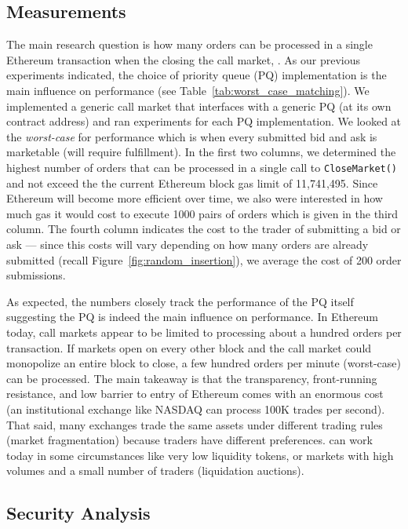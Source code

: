  \subsection{Measurements}
 
 
 
The main research question is how many orders can be processed in a single Ethereum transaction when the closing the call market, . As our previous experiments indicated, the choice of priority queue (PQ) implementation is the main influence on performance (see Table~\ref{tab:worst_case_matching}). We implemented a generic call market that interfaces with a generic PQ (at its own contract address) and ran experiments for each PQ implementation. We looked at the \textit{worst-case} for performance which is when every submitted bid and ask is marketable (\ie will require fulfillment). In the first two columns, we determined the highest number of orders that can be processed in a single call to \texttt{CloseMarket()} and not exceed the the current Ethereum block gas limit of 11,741,495. Since Ethereum will become more efficient over time, we also were interested in how much gas it would cost to execute 1000 pairs of orders which is given in the third column. The fourth column indicates the cost to the trader of submitting a bid or ask --- since this costs will vary depending on how many orders are already submitted (recall Figure~\ref{fig:random_insertion}), we average the cost of 200 order submissions. 

As expected, the numbers closely track the performance of the PQ itself suggesting the PQ is indeed the main influence on performance. In Ethereum today, call markets appear to be limited to processing about a hundred orders per transaction. If markets open on every other block and the call market could monopolize an entire block to close, a few hundred orders per minute (worst-case) can be processed. The main takeaway is that the transparency, front-running resistance, and low barrier to entry of Ethereum comes with an enormous cost (\ie an institutional exchange like NASDAQ can process 100K trades per second). That said, many exchanges trade the same assets under different trading rules (\ie market fragmentation) because traders have different preferences. \cm can work today in some circumstances like very low liquidity tokens, or markets with high volumes and a small number of traders (\eg liquidation auctions). 

\subsection{Security Analysis} \label{sec:front}


